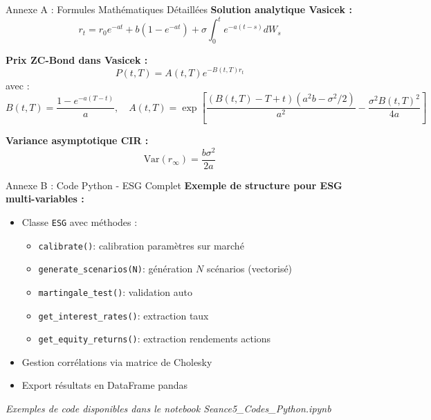 \documentclass[10pt,aspectratio=169]{beamer}
\newcommand{\Var}{\text{Var}}
\begin{document}
\appendix

\begin{frame}{Annexe A : Formules Mathématiques Détaillées}
\textbf{Solution analytique Vasicek :}
\[
r_t = r_0 e^{-at} + b(1 - e^{-at}) + \sigma \int_0^t e^{-a(t-s)} dW_s
\]

\vspace{0.3cm}
\textbf{Prix ZC-Bond dans Vasicek :}
\[
P(t, T) = A(t,T) e^{-B(t,T) r_t}
\]
avec :
\[
B(t,T) = \frac{1 - e^{-a(T-t)}}{a}, \quad A(t,T) = \exp\left[\frac{(B(t,T) - T + t)(a^2 b - \sigma^2/2)}{a^2} - \frac{\sigma^2 B(t,T)^2}{4a}\right]
\]

\vspace{0.3cm}
\textbf{Variance asymptotique CIR :}
\[
\Var(r_\infty) = \frac{b\sigma^2}{2a}
\]
\end{frame}

\begin{frame}{Annexe B : Code Python - ESG Complet}
\textbf{Exemple de structure pour ESG multi-variables :}

\begin{itemize}
    \item Classe \texttt{ESG} avec méthodes :
    \begin{itemize}
        \item \texttt{calibrate()}: calibration paramètres sur marché
        \item \texttt{generate\_scenarios(N)}: génération $N$ scénarios (vectorisé)
        \item \texttt{martingale\_test()}: validation auto
        \item \texttt{get\_interest\_rates()}: extraction taux
        \item \texttt{get\_equity\_returns()}: extraction rendements actions
    \end{itemize}
    \item Gestion corrélations via matrice de Cholesky
    \item Export résultats en DataFrame pandas
\end{itemize}

\vspace{0.3cm}
\textit{Exemples de code disponibles dans le notebook Seance5\_Codes\_Python.ipynb}
\end{frame}
\end{document}
